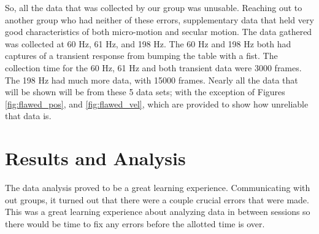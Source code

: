 \documentclass[12pt]{article}
\begin{document}
So, all the data that was collected by our group was unusable. Reaching out to another group who had neither of these errors, supplementary data that held very good characteristics of both micro-motion and secular motion. The data gathered was collected at 60 Hz, 61 Hz, and 198 Hz. The 60 Hz and 198 Hz both had captures of a transient response from bumping the table with a fist. The collection time for the 60 Hz, 61 Hz and both transient data were 3000 frames. The 198 Hz had much more data, with 15000 frames. Nearly all the data that will be shown will be from these 5 data sets; with the exception of Figures \ref{fig:flawed_pos}, and \ref{fig:flawed_vel}, which are provided to show how unreliable that data is. 


\section{Results and Analysis}
The data analysis proved to be a great learning experience. Communicating with out groups, it turned out that there were a couple crucial errors that were made. This was a great learning experience about analyzing data in between sessions so there would be time to fix any errors before the allotted time is over. 
\end{document}
